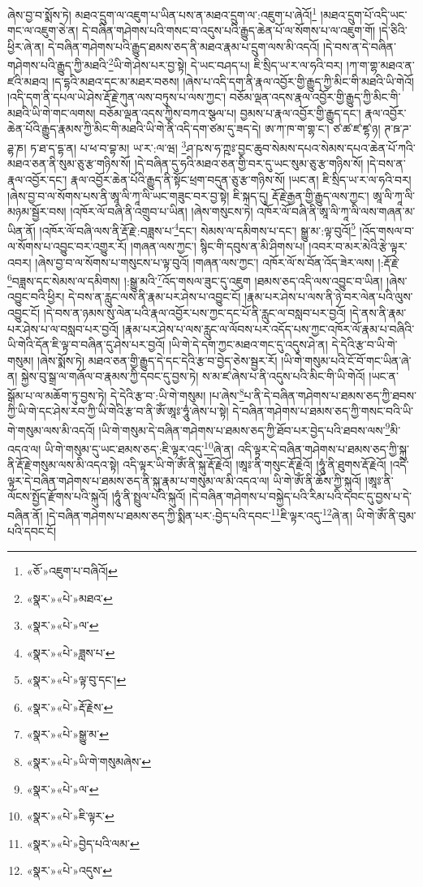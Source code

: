 ཞེས་བྱ་བ་སྨོས་ཏེ། མཐའ་དྲུག་ལ་འཇུག་པ་ཡིན་པས་ན་མཐའ་དྲུག་ལ་:འཇུག་པ་ཞེའོ།\footnote{«ཅོ་»འཇུག་པ་བཞིའོ།} །མཐའ་དྲུག་པོ་འདི་ཡང་གང་ལ་འཇུག་ཅེ་ན། དེ་བཞིན་གཤེགས་པའི་གསང་བ་འདུས་པའི་རྒྱུད་ཆེན་པོ་ལ་སོགས་པ་ལ་འཇུག་གོ། །དེ་ཅིའི་ཕྱིར་ཞེ་ན། དེ་བཞིན་གཤེགས་པའི་རྒྱུད་ཐམས་ཅད་ནི་མཐའ་རྣམ་པ་དྲུག་ལས་མི་འདའོ། །དེ་བས་ན་དེ་བཞིན་གཤེགས་པའི་རྒྱུད་ཀྱི་མཐའི་\footnote{«སྣར་»«པེ་»མཐའ་}ཡི་གེ་ཤེས་པར་བྱ་སྟེ། དེ་ཡང་བཤད་པ། ཇི་སྲིད་ཡ་ར་ལ་ཧའི་བར། །ཀ་ག་གྷ་མཐའ་ན་ཛའི་མཐའ། །ད་དྷའི་མཐའ་དང་མ་མཐར་བཅས། །ཞེས་པ་འདི་དག་ནི་རྣལ་འབྱོར་གྱི་རྒྱུད་ཀྱི་མིང་གི་མཐའི་ཡི་གེའོ། །འདི་དག་ནི་དཔལ་ཡེ་ཤེས་རྡོ་རྗེ་ཀུན་ལས་བཏུས་པ་ལས་ཀྱང་། བཅོམ་ལྡན་འདས་རྣལ་འབྱོར་གྱི་རྒྱུད་ཀྱི་མིང་གི་མཐའི་ཡི་གེ་གང་ལགས། བཅོམ་ལྡན་འདས་ཀྱིས་བཀའ་སྩལ་པ། བྱམས་པ་རྣལ་འབྱོར་གྱི་རྒྱུད་དང་། རྣལ་འབྱོར་ཆེན་པོའི་རྒྱུད་རྣམས་ཀྱི་མིང་གི་མཐའི་ཡི་གེ་ནི་འདི་དག་ཙམ་དུ་ཟད་དེ། ཨ་ཀ་ཁ་ག་གྷ་ང་། ཙ་ཚ་ཛ་ཛྷ་ཉ། ཊ་ཋ་ཌ་ཌྷ་ཎ། ཏ་ཐ་ད་དྷ་ན། པ་ཕ་བ་བྷ་མ། ཡ་ར་:ལ་ཝ། \footnote{«སྣར་»«པེ་»ལ་}ཤ་ཥ་ས་ཧ་ཀྵཿ་བྱང་ཆུབ་སེམས་དཔའ་སེམས་དཔའ་ཆེན་པོ་ཀའི་མཐའ་ཅན་ནི་སུམ་ཅུ་རྩ་གཉིས་སོ། །དེ་བཞིན་དུ་ཧའི་མཐའ་ཅན་གྱི་བར་དུ་ཡང་སུམ་ཅུ་རྩ་གཉིས་སོ། །དེ་བས་ན་རྣལ་འབྱོར་དང་། རྣལ་འབྱོར་ཆེན་པོའི་རྒྱུད་ནི་སྟོང་ཕྲག་བདུན་ཅུ་རྩ་གཉིས་སོ། །ཡང་ན། ཇི་སྲིད་ཡ་ར་ལ་ཧའི་བར། །ཞེས་བྱ་བ་ལ་སོགས་པས་ནི་ཨཱ་ལི་ཀཱ་ལི་ཡང་གཟུང་བར་བྱ་སྟེ། ཇི་སྐད་དུ། རྡོ་རྗེ་རྒྱན་གྱི་རྒྱུད་ལས་ཀྱང་། ཨཱ་ལི་ཀཱ་ལི་མཉམ་སྦྱོར་བས། །འཁོར་ལོ་བཞི་ནི་འགྲུབ་པ་ཡིན། །ཞེས་གསུངས་ཏེ། འཁོར་ལོ་བཞི་ནི་ཨཱ་ལི་ཀཱ་ལི་ལས་གཞན་མ་ཡིན་ནོ། །འཁོར་ལོ་བཞི་ལས་ནི་རྡོ་རྗེ་:བཟླས་པ་\footnote{«སྣར་»«པེ་»ཟླས་པ་}དང་། སེམས་ལ་དམིགས་པ་དང་། སྒྱུ་མ་:ལྟ་བུའོ།\footnote{«སྣར་»«པེ་»ལྟ་བུ་དང་།} །འོད་གསལ་བ་ལ་སོགས་པ་འབྱུང་བར་འགྱུར་རོ། །གཞན་ལས་ཀྱང་། སྙིང་གི་དབུས་ན་མི་ཤིགས་པ། །འབར་བ་མར་མེའི་རྩེ་ལྟར་འབར། །ཞེས་བྱ་བ་ལ་སོགས་པ་གསུངས་པ་ལྟ་བུའོ། །གཞན་ལས་ཀྱང་། འཁོར་ལོ་ས་བོན་འོད་ཟེར་ལས། །:རྡོ་རྗེ་\footnote{«སྣར་»«པེ་»རྡོ་རྗེས་}བཟླས་དང་སེམས་ལ་དམིགས། །:སྒྱུ་མའི་\footnote{«སྣར་»«པེ་»སྒྱུ་མ་}འོད་གསལ་ཟུང་དུ་འཇུག །ཐམས་ཅད་འདི་ལས་འབྱུང་བ་ཡིན། །ཞེས་འབྱུང་བའི་ཕྱིར། དེ་བས་ན་རླུང་ལས་ནི་རྣམ་པར་ཤེས་པ་འབྱུང་ངོ། །རྣམ་པར་ཤེས་པ་ལས་ནི་ཉེ་བར་ལེན་པའི་ལུས་འབྱུང་ངོ། །དེ་བས་ན་ཉམས་སུ་ལེན་པའི་རྣལ་འབྱོར་པས་ཀྱང་དང་པོ་ནི་རླུང་ལ་བསླབ་པར་བྱའོ། །དེ་ནས་ནི་རྣམ་པར་ཤེས་པ་ལ་བསླབ་པར་བྱའོ། །རྣམ་པར་ཤེས་པ་ལས་རླུང་ལ་ལོབས་པར་འདོད་པས་ཀྱང་འཁོར་ལོ་རྣམ་པ་བཞིའི་ཡི་གེའི་དོན་ཇི་ལྟ་བ་བཞིན་དུ་ཤེས་པར་བྱའོ། །ཡི་གེ་དེ་དག་ཀྱང་མཐའ་གང་དུ་འདུས་ཤེ་ན། དེ་དེའི་རྩ་བ་ཡི་གེ་གསུམ། །ཞེས་སྨོས་ཏེ། མཐའ་ཅན་གྱི་རྒྱུད་དེ་དང་དེའི་རྩ་བ་བྱེད་ཅེས་སྦྱར་རོ། །ཡི་གེ་གསུམ་པའི་ངོ་བོ་གང་ཡིན་ཞེ་ན། སྐྱེས་བུ་སྒྲ་ལ་གཞོལ་བ་རྣམས་ཀྱི་དབང་དུ་བྱས་ཏེ། ས་མ་ཛ་ཞེས་པ་ནི་འདུས་པའི་མིང་གི་ཡི་གེའོ། །ཡང་ན་སྒོམ་པ་ལ་མཆོག་ཏུ་བྱས་ཏེ། དེ་དེའི་རྩ་བ་:ཡི་གེ་གསུམ། །པ་ཞེས་\footnote{«སྣར་»«པེ་»ཡི་གེ་གསུམཞེས་}པ་ནི་དེ་བཞིན་གཤེགས་པ་ཐམས་ཅད་ཀྱི་ཐབས་ཀྱི་ཡི་གེ་དང་ཤེས་རབ་ཀྱི་ཡི་གེའི་རྩ་བ་ནི་ཨོཾ་ཨཱཿ་ཧཱུཾ་ཞེས་པ་སྟེ། དེ་བཞིན་གཤེགས་པ་ཐམས་ཅད་ཀྱི་གསང་བའི་ཡི་གེ་གསུམ་ལས་མི་འདའོ། །ཡི་གེ་གསུམ་དེ་བཞིན་གཤེགས་པ་ཐམས་ཅད་ཀྱི་ཐོབ་པར་བྱེད་པའི་ཐབས་ལས་\footnote{«སྣར་»«པེ་»ལ་}མི་འདའ་ལ། ཡི་གེ་གསུམ་དུ་ཡང་ཐམས་ཅད་:ཇི་ལྟར་འདུ་\footnote{«སྣར་»«པེ་»ཇི་ལྟར་}ཞེ་ན། འདི་ལྟར་དེ་བཞིན་གཤེགས་པ་ཐམས་ཅད་ཀྱི་སྐུ་ནི་རྡོ་རྗེ་གསུམ་ལས་མི་འདའ་སྟེ། འདི་ལྟར་ཡི་གེ་ཨོཾ་ནི་སྐུ་རྡོ་རྗེའོ། །ཨཱཿ་ནི་གསུང་རྡོ་རྗེའོ། །ཧཱུཾ་ནི་ཐུགས་རྡོ་རྗེའོ། །འདི་ལྟར་དེ་བཞིན་གཤེགས་པ་ཐམས་ཅད་ནི་སྐུ་རྣམ་པ་གསུམ་ལ་མི་འདའ་ལ། ཡི་གེ་ཨོཾ་ནི་ཆོས་ཀྱི་སྐུའོ། །ཨཱཿ་ནི་ལོངས་སྤྱོད་རྫོགས་པའི་སྐུའོ། །ཧཱུཾ་ནི་སྤྲུལ་པའི་སྐུའོ། །དེ་བཞིན་གཤེགས་པ་བསྐྱེད་པའི་རིམ་པའི་དབང་དུ་བྱས་པ་དེ་བཞིན་ནོ། །དེ་བཞིན་གཤེགས་པ་ཐམས་ཅད་ཀྱི་སྨིན་པར་:བྱེད་པའི་དབང་\footnote{«སྣར་»«པེ་»བྱེད་པའི་ལམ་}ཇི་ལྟར་འདུ་\footnote{«སྣར་»«པེ་»འདུས་}ཞེ་ན། ཡི་གེ་ཨོཾ་ནི་བུམ་པའི་དབང་ངོ། 